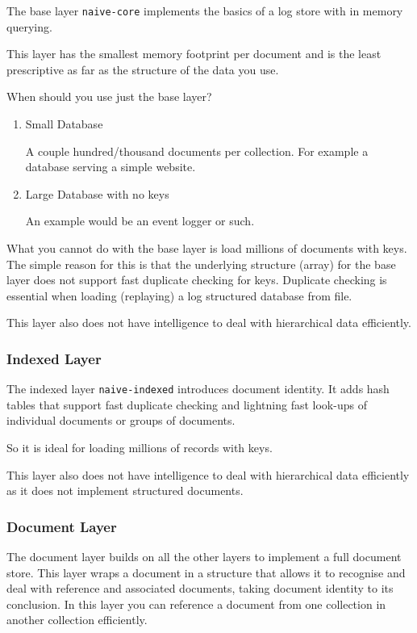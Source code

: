 \documentclass[11pt]{article}
\begin{document}
The base layer \texttt{naive-core} implements the basics of a log store with
in memory querying.

This layer has the smallest memory footprint per document and is the
least prescriptive as far as the structure of the data you use.

When should you use just the base layer?

\begin{enumerate}
\item Small Database

A couple hundred/thousand documents per collection. For example a
database serving a simple website.

\item Large Database with no keys

An example would be an event logger or such.
\end{enumerate}

What you cannot do with the base layer is load millions of documents
with keys. The simple reason for this is that the underlying structure
(array) for the base layer does not support fast duplicate checking
for keys. Duplicate checking is essential when loading (replaying) a log
structured database from file.

This layer also does not have intelligence to deal with hierarchical
data efficiently.

\subsubsection{Indexed Layer}
\label{sec:orge4e7b4e}

The indexed layer \texttt{naive-indexed} introduces document identity. It
adds hash tables that support fast duplicate checking and lightning
fast look-ups of individual documents or groups of documents.

So it is ideal for loading millions of records with keys.

This layer also does not have intelligence to deal with hierarchical
data efficiently as it does not implement structured documents.

\subsubsection{Document Layer}
\label{sec:org4f4a6c7}

The document layer builds on all the other layers to implement a full
document store. This layer wraps a document in a structure that allows it to
recognise and deal with reference and associated documents, taking
document identity to its conclusion. In this layer you can reference a
document from one collection in another collection efficiently.
\end{document}
